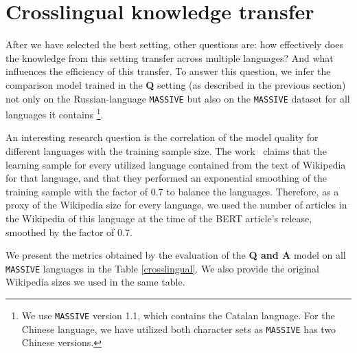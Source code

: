 \section{Crosslingual knowledge transfer} 


After we have selected the best setting, other questions are: how effectively does the knowledge from this setting transfer across multiple languages? And what influences the efficiency of this transfer. To answer this question, we infer the comparison model trained in the \textbf{Q} setting (as described in the previous section) not only on the Russian-language \texttt{MASSIVE} but also on the \texttt{MASSIVE} dataset for all languages it contains \footnote{We use \texttt{MASSIVE} version 1.1, which contains the Catalan language. For the Chinese language, we have utilized both character sets as \texttt{MASSIVE} has two Chinese versions.}. 

An interesting research question is the correlation of the model quality for different languages with the training sample size. The work~\cite{bert} claims that the learning sample for every utilized language contained from the text of Wikipedia for that language, and that they performed an exponential smoothing of the training sample with the factor of 0.7 to balance the languages. Therefore, as a proxy of the Wikipedia size for every language, we used the number of articles in the Wikipedia of this language at the time of the BERT article's release, smoothed by the factor of 0.7. 

We present the metrics obtained by the evaluation of the \textbf{Q and A} model on all \texttt{MASSIVE} languages in the Table \ref{crosslingual}. We also provide the original Wikipedia sizes we used in the same table. 

